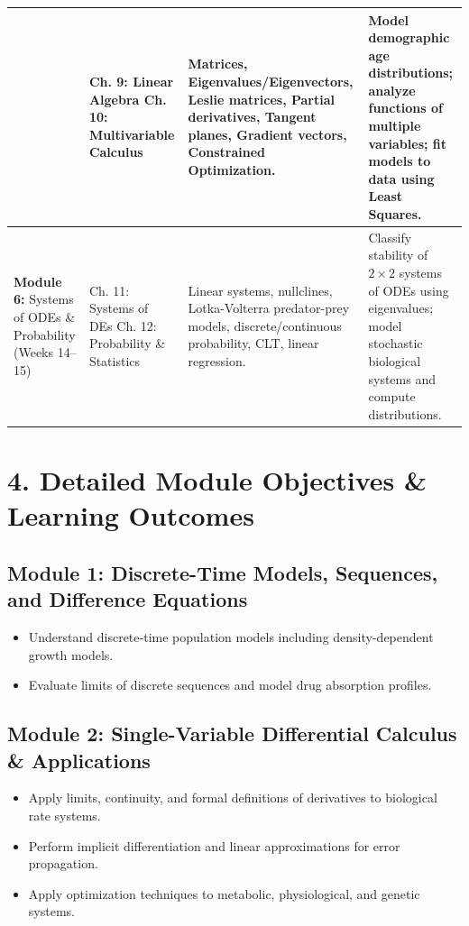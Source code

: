 \documentclass[10pt,letterpaper]{article}
\begin{document}
\begin{table}[h!]
\begin{tabular}{p{2.2cm} p{3.2cm} p{5.5cm} p{5.0cm}}
& Ch. 9: Linear Algebra \newline Ch. 10: Multivariable Calculus 
& Matrices, Eigenvalues/Eigenvectors, Leslie matrices, Partial derivatives, Tangent planes, Gradient vectors, Constrained Optimization. 
& Model demographic age distributions; analyze functions of multiple variables; fit models to data using Least Squares. \\
\midrule
\textbf{Module 6:} \newline Systems of ODEs \& Probability \newline (Weeks 14--15) 
& Ch. 11: Systems of DEs \newline Ch. 12: Probability \& Statistics 
& Linear systems, nullclines, Lotka-Volterra predator-prey models, discrete/continuous probability, CLT, linear regression. 
& Classify stability of $2\times2$ systems of ODEs using eigenvalues; model stochastic biological systems and compute distributions. \\
\bottomrule
\end{tabular}
\end{table}

\newpage

\section*{4. Detailed Module Objectives \& Learning Outcomes}

\subsection*{Module 1: Discrete-Time Models, Sequences, and Difference Equations}
\begin{itemize}[noitemsep]
    \item Understand discrete-time population models including density-dependent growth models.
    \item Evaluate limits of discrete sequences and model drug absorption profiles.
\end{itemize}

\subsection*{Module 2: Single-Variable Differential Calculus \& Applications}
\begin{itemize}[noitemsep]
    \item Apply limits, continuity, and formal definitions of derivatives to biological rate systems.
    \item Perform implicit differentiation and linear approximations for error propagation.
    \item Apply optimization techniques to metabolic, physiological, and genetic systems.

\end{itemize}
\end{document}
